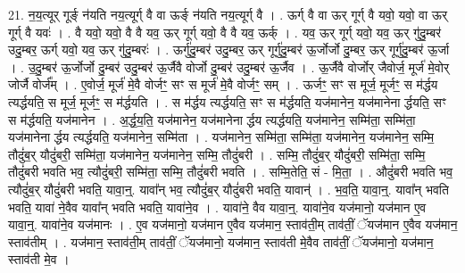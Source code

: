 \documentclass[17pt]{extarticle}
\begin{document}
21. न॒य॒त्यूर् गूर्ङ् न॑यति नय॒त्यूर्ग् वै वा ऊर्ङ् न॑यति नय॒त्यूर्ग् वै । . ऊर्ग् वै वा ऊर् गूर्ग् वै यवो॒ यवो॒ वा ऊर् गूर्ग् वै यवः॑ । . वै यवो॒ यवो॒ वै वै यव॒ ऊर् गूर्ग् यवो॒ वै वै यव॒ ऊर्क् । . यव॒ ऊर् गूर्ग् यवो॒ यव॒ ऊर् गु॑दु॒म्बर॑ उदु॒म्बर॒ ऊर्ग् यवो॒ यव॒ ऊर् गु॑दु॒म्बरः॑ । . ऊर्गु॑दु॒म्बर॑ उदु॒म्बर॒ ऊर् गूर्गु॑दु॒म्बर॑ ऊ॒र्जोर्जो दु॒म्बर॒ ऊर् गूर्गु॑दु॒म्बर॑ ऊ॒र्जा । . उ॒दु॒म्बर॑ ऊ॒र्जोर्जो दु॒म्बर॑ उदु॒म्बर॑ ऊ॒र्जैवै वोर्जो दु॒म्बर॑ उदु॒म्बर॑ ऊ॒र्जैव । . ऊ॒र्जैवै वोर्जोर् जैवोर्ज॒ मूर्ज॑ मे॒वोर् जोर्जै वोर्ज᳚म् । . ए॒वोर्ज॒ मूर्ज॑ मे॒वै वोर्जꣳ॒॒ सꣳ स मूर्ज॑ मे॒वै वोर्जꣳ॒॒ सम् । . ऊर्जꣳ॒॒ सꣳ स मूर्ज॒ मूर्जꣳ॒॒ स म॑र्द्धय त्यर्द्धयति॒ स मूर्ज॒ मूर्जꣳ॒॒ स म॑र्द्धयति । . स म॑र्द्धय त्यर्द्धयति॒ सꣳ स म॑र्द्धयति॒ यज॑मानेन॒ यज॑मानेना र्द्धयति॒ सꣳ स म॑र्द्धयति॒ यज॑मानेन । . अ॒र्द्ध॒य॒ति॒ यज॑मानेन॒ यज॑मानेना र्द्धय त्यर्द्धयति॒ यज॑मानेन॒ सम्मि॑ता॒ सम्मि॑ता॒ 
यज॑मानेना र्द्धय त्यर्द्धयति॒ यज॑मानेन॒ सम्मि॑ता । . यज॑मानेन॒ सम्मि॑ता॒ सम्मि॑ता॒ यज॑मानेन॒ यज॑मानेन॒ सम्मि॒ तौदुं॑ब॒र् यौदुं॑बरी॒ सम्मि॑ता॒ यज॑मानेन॒ यज॑मानेन॒ सम्मि॒ तौदुं॑बरी । . सम्मि॒ तौदुं॑ब॒र् यौदुं॑बरी॒ सम्मि॑ता॒ सम्मि॒ तौदुं॑बरी भवति भव॒ त्यौदुं॑बरी॒ सम्मि॑ता॒ 
सम्मि॒ तौदुं॑बरी भवति । . सम्मि॒तेति॒ सं - मि॒ता॒ । . औदुं॑बरी भवति भव॒ त्यौदुं॑ब॒र् यौदुं॑बरी भवति॒ यावा॒न्॒. यावा᳚न् भव॒ त्यौदुं॑ब॒र् यौदुं॑बरी भवति॒ यावान्॑ । . भ॒व॒ति॒ यावा॒न्॒. यावा᳚न् भवति भवति॒ यावा॑ ने॒वैव यावा᳚न् भवति भवति॒ यावा॑ने॒व । . यावा॑ने॒ वैव यावा॒न्॒. यावा॑ने॒व यज॑मानो॒ यज॑मान ए॒व यावा॒न्॒. यावा॑ने॒व यज॑मानः । . ए॒व यज॑मानो॒ यज॑मान ए॒वैव यज॑मान॒ स्ताव॑ती॒म् ताव॑तीं॒ ॅयज॑मान ए॒वैव यज॑मान॒ स्ताव॑तीम् । . यज॑मान॒ स्ताव॑ती॒म् ताव॑तीं॒ ॅयज॑मानो॒ यज॑मान॒ स्ताव॑ती मे॒वैव ताव॑तीं॒ ॅयज॑मानो॒ यज॑मान॒ स्ताव॑ती मे॒व । \newline
\end{document}
